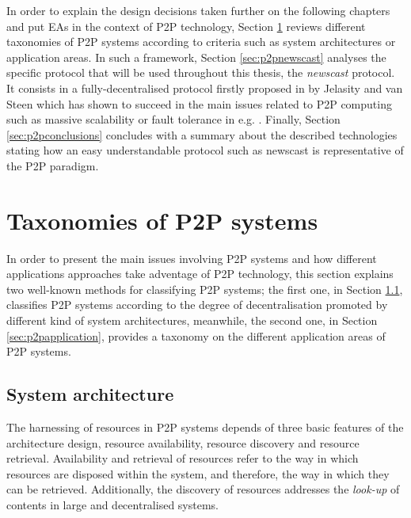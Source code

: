 In order to explain the design decisions taken further on the following chapters and put EAs in the context of P2P technology, Section \ref{sec:p2ptaxonomy} reviews different taxonomies of P2P systems according to criteria such as system architectures or application areas. In such a framework, Section
\ref{sec:p2pnewscast} analyses the specific protocol that will be used throughout this thesis, the \emph{newscast}
protocol. It consists in a fully-decentralised protocol firstly proposed in \cite{jelasity:newscast} by Jelasity and van Steen which has shown to succeed in the main issues related to P2P computing such as massive scalability or fault tolerance in e.g. \cite{jelasity:gossip,spyros:robustscalable,peersampling}. 
 Finally, Section \ref{sec:p2pconclusions} concludes with a summary about the described technologies stating how an easy understandable protocol such as newscast is representative of the P2P paradigm.
 

\section{Taxonomies of P2P systems}
\label{sec:p2ptaxonomy}

In order to present the main issues involving P2P systems and how different applications approaches take adventage of P2P technology, this section explains two well-known methods for classifying P2P systems; the first one, in Section \ref{sec:p2parchitecture}, classifies P2P systems according to the degree of decentralisation promoted by different kind of system architectures, meanwhile, the second one, in Section \ref{sec:p2papplication}, provides a taxonomy on the different application areas of P2P systems.


\subsection{System architecture}
\label{sec:p2parchitecture}

The harnessing of resources in P2P systems depends of three basic features of the architecture design, resource availability, resource discovery and resource retrieval. Availability and retrieval of resources refer to the way in which resources are disposed within the system, and therefore, the way in which they can be retrieved. Additionally, the discovery of resources addresses the {\em look-up} of contents in large and decentralised systems.



